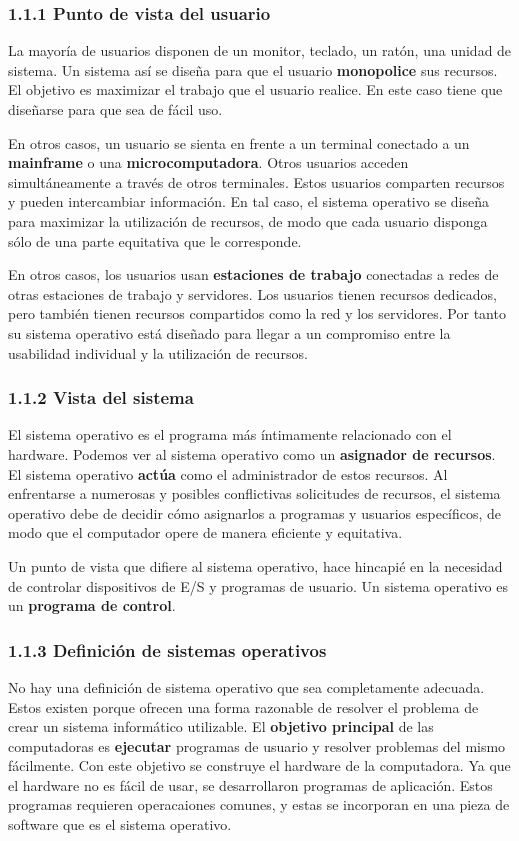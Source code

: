 \documentclass{article}
\begin{document}
\subsubsection*{1.1.1 Punto de vista del usuario}
La mayor\'{i}a de usuarios disponen de un monitor, teclado, un rat\'{o}n, una unidad de sistema.
Un sistema as\'{i} se dise\~{n}a para que el usuario \textbf{monopolice} sus recursos. El objetivo
es maximizar el trabajo que el usuario realice. En este caso tiene que dise\~{n}arse para que sea
de f\'{a}cil uso.

En otros casos, un usuario se sienta en frente a un terminal conectado a un \textbf{mainframe} o una
\textbf{microcomputadora}. Otros usuarios acceden simult\'{a}neamente a trav\'{e}s de otros terminales.
Estos usuarios comparten recursos y pueden intercambiar informaci\'{o}n. En tal caso, el sistema operativo
se dise\~{n}a para maximizar la utilizaci\'{o}n de recursos, de modo que cada usuario disponga s\'{o}lo de 
una parte equitativa que le corresponde.

En otros casos, los usuarios usan \textbf{estaciones de trabajo} conectadas a redes de otras estaciones de
trabajo y servidores. Los usuarios tienen recursos dedicados, pero tambi\'{e}n tienen recursos compartidos
como la red y los servidores. Por tanto su sistema operativo est\'{a} dise\~{n}ado para llegar a un compromiso
entre la usabilidad individual y la utilizaci\'{o}n de recursos.

\subsubsection*{1.1.2 Vista del sistema}
El sistema operativo es el programa m\'{a}s \'{i}ntimamente relacionado con el hardware. Podemos ver al sistema
operativo como un \textbf{asignador de recursos}. El sistema operativo \textbf{act\'{u}a} como el administrador
de estos recursos. Al enfrentarse a numerosas y posibles conflictivas solicitudes de recursos, el sistema operativo
debe de decidir c\'{o}mo asignarlos a programas y usuarios espec\'{i}ficos, de modo que el computador opere de manera
eficiente y equitativa.

Un punto de vista que difiere al sistema operativo, hace hincapi\'{e} en la necesidad de controlar dispositivos de 
E/S y programas de usuario. Un sistema operativo es un \textbf{programa de control}.

\subsubsection*{1.1.3 Definici\'{o}n de sistemas operativos}
No hay una definici\'{o}n de sistema operativo que sea completamente adecuada. Estos existen porque ofrecen una forma
razonable de resolver el problema de crear un sistema inform\'{a}tico utilizable. El \textbf{objetivo principal} de
las computadoras es \textbf{ejecutar} programas de usuario y resolver problemas del mismo f\'{a}cilmente. Con este
objetivo se construye el hardware de la computadora. Ya que el hardware no es f\'{a}cil de usar, se desarrollaron 
programas de aplicaci\'{o}n. Estos programas requieren operacaiones comunes, y estas se incorporan en una pieza de software
que es el sistema operativo.
\end{document}
